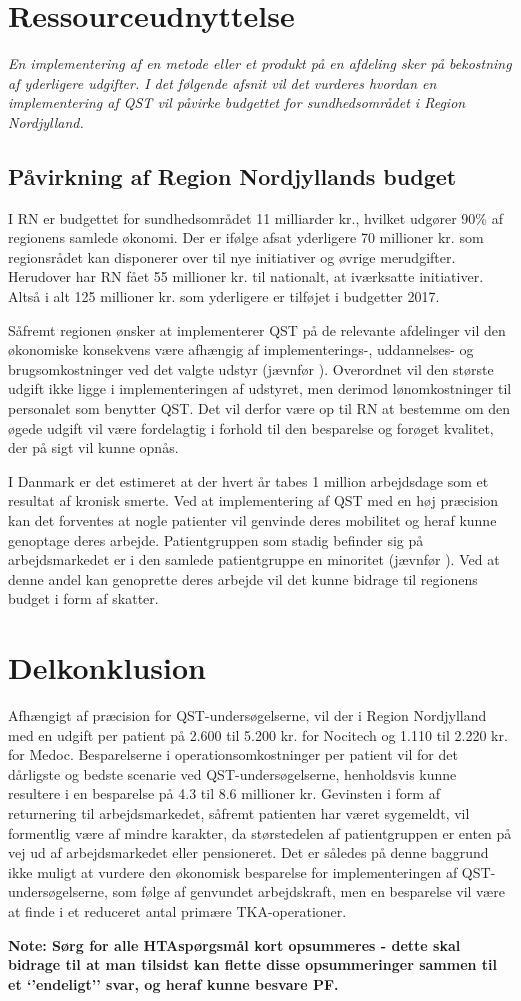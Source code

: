 \section{Ressourceudnyttelse}
\textit{En implementering af en metode eller et produkt på en afdeling sker på bekostning af yderligere udgifter. I det følgende afsnit vil det vurderes hvordan en implementering af QST vil påvirke budgettet for sundhedsområdet i Region Nordjylland.}


\subsection{Påvirkning af Region Nordjyllands budget}
I RN er budgettet for sundhedsområdet 11 milliarder kr., hvilket udgører 90\% af regionens samlede økonomi. \citep{RnBudget17}  Der er ifølge  afsat yderligere 70 millioner kr. som regionsrådet kan disponerer over til nye initiativer og øvrige merudgifter. Herudover har RN fået 55 millioner kr. til nationalt, at iværksatte initiativer. Altså i alt 125 millioner kr. som yderligere er tilføjet i budgetter 2017.


Såfremt regionen ønsker at implementerer QST på de relevante afdelinger vil den økonomiske konsekvens være afhængig af implementerings-, uddannelses- og brugsomkostninger ved det valgte udstyr (jævnfør ). Overordnet vil den største udgift ikke ligge i implementeringen af udstyret, men derimod lønomkostninger til personalet som benytter QST. Det vil derfor være op til RN at bestemme om den øgede udgift vil være fordelagtig i forhold til den besparelse og forøget kvalitet, der på sigt vil kunne opnås. 


I Danmark er det estimeret at der hvert år tabes 1 million arbejdsdage som et resultat af kronisk smerte. \citep{Eriksen2006} Ved at implementering af QST med en høj præcision kan det forventes at nogle patienter vil genvinde deres mobilitet og heraf kunne genoptage deres arbejde. Patientgruppen som stadig befinder sig på arbejdsmarkedet er i den samlede patientgruppe en minoritet (jævnfør ). Ved at denne andel kan genoprette deres arbejde vil det kunne bidrage til regionens budget i form af skatter. 


\section{Delkonklusion}
Afhængigt af præcision for QST-undersøgelserne, vil der i Region Nordjylland med en udgift per patient på 2.600 til 5.200 kr. for Nocitech og 1.110 til 2.220 kr. for Medoc. Besparelserne i operationsomkostninger per patient vil for det dårligste og bedste scenarie ved QST-undersøgelserne, henholdsvis kunne resultere i en besparelse på 4.3 til 8.6 millioner kr. Gevinsten i form af returnering til arbejdsmarkedet, såfremt patienten har været sygemeldt, vil formentlig være af mindre karakter, da størstedelen af patientgruppen er enten på vej ud af arbejdsmarkedet eller pensioneret. Det er således på denne baggrund ikke muligt at vurdere den økonomisk besparelse for implementeringen af QST-undersøgelserne, som følge af genvundet arbejdskraft, men en besparelse vil være at finde i et reduceret antal primære TKA-operationer.  


\textbf{Note: Sørg for alle HTAspørgsmål kort opsummeres - dette skal bidrage til at man tilsidst kan flette disse opsummeringer sammen til et ‘’endeligt’’ svar, og heraf kunne besvare PF.}
